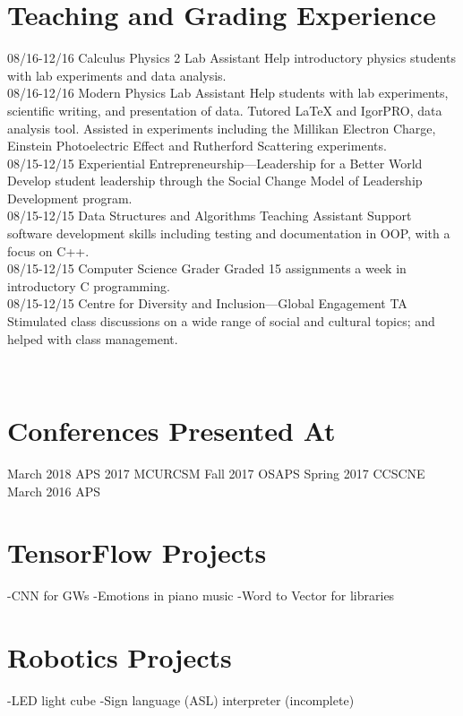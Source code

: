 \documentclass[]{friggeri-cv}
\begin{document}
\section{Teaching and Grading Experience}
\begin{entrylist}
  \entry
    {08/16-12/16}
    {Calculus Physics 2 Lab Assistant}
    {}
    {Help introductory physics students with lab experiments and data analysis.\\}
  \entry
    {08/16-12/16}
    {Modern Physics Lab Assistant}
    {}
    {Help students with lab experiments, scientific writing, and presentation of data. Tutored LaTeX and IgorPRO, data analysis tool. Assisted in experiments including the Millikan Electron Charge, Einstein Photoelectric Effect and Rutherford Scattering experiments.\\}
    \entry
    {08/15-12/15}
    {Experiential Entrepreneurship—Leadership for a Better World}
    {}
    {Develop student leadership through the Social Change Model of Leadership Development program.\\}
  \entry
    {08/15-12/15}
    {Data Structures and Algorithms Teaching Assistant}
    {}
    {Support software development skills including testing and documentation in OOP, with a focus on C++.\\}
    \entry
    {08/15-12/15}
    {Computer Science Grader}
    {}
    {Graded 15 assignments a week in introductory C programming. \\}
    \entry
    {08/15-12/15}
    {Centre for Diversity and Inclusion—Global Engagement TA}
    {}
    {Stimulated class discussions on a wide range of social and cultural topics; and helped with class management. \\}
\end{entrylist}
\newpage


\begin{aside}
~
~
~
~
\section{Conferences Presented At}
March 2018 APS
2017 MCURCSM 
Fall 2017 OSAPS
Spring 2017 CCSCNE
March 2016 APS
~
~
~
~
~
~
~
~
~~~~~~~~~
\section{TensorFlow Projects}
-CNN for GWs
-Emotions in piano music
-Word to Vector for libraries
~
~
~
\section{Robotics Projects}
-LED light cube
-Sign language (ASL) 
interpreter (incomplete)
\end{aside}
\end{document}
